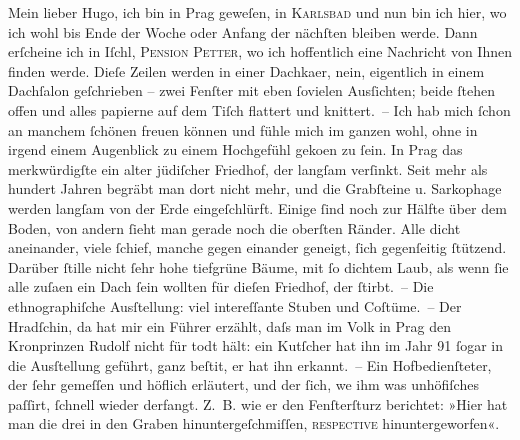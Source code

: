 \pstart{}Mein lieber Hugo,\pend\vspace{0.5em}
\pstart
           ich bin in Prag geweſen, in \textsc{Karlsbad} und nun bin ich hier, wo ich wohl bis Ende der Woche oder Anfang der nächſten
               bleiben werde. Dann erſcheine ich in Iſchl, \textsc{Pension Petter}, wo ich hoffentlich eine Nachricht von Ihnen finden werde. Dieſe Zeilen werden
               in einer Dachka{\geminationm}er, nein, eigentlich in einem Dachſalon
               geſchrieben – zwei Fenſter mit eben ſovielen Ausſichten; beide ſtehen offen und alles
               papierne {\pb}auf dem Tiſch flattert und knittert. – Ich hab
               mich ſchon an manchem ſchönen freuen können und fühle mich im ganzen wohl, ohne in
               irgend einem Augenblick zu einem Hochgefühl geko{\geminationm}en zu
               ſein. In Prag das merkwürdigſte ein alter jüdiſcher Friedhof, der
               langſam verſinkt. Seit mehr als hundert Jahren begräbt man dort nicht mehr, und die
               Grabſteine u. Sarkophage werden langſam von der Erde eingeſchlürft. Einige ſind noch
               zur Hälfte über dem Boden, von andern ſieht man gerade noch die oberſten Ränder. Alle
               dicht aneinander, viele ſchief, manche gegen einander geneigt, ſich gegenſeitig {\pb}ſtützend. Darüber ſtille nicht ſehr hohe tiefgrüne Bäume,
               mit ſo dichtem Laub, als wenn ſie alle zuſa{\geminationm}en ein Dach
               ſein wollten für dieſen Friedhof, der ſtirbt. – Die ethnographiſche
                  Ausſtellung: viel intereſſante Stuben und Coſtüme. – Der Hradſchin, da hat mir ein Führer erzählt, daſs man im Volk in
                  Prag den Kronprinzen Rudolf nicht für todt hält: ein Kutſcher hat ihn im Jahr
                  91{ }ſogar in die Ausſtellung geführt, ganz beſti{\geminationm}t, er hat ihn erkannt. – Ein Hofbedienſteter, der ſehr
               gemeſſen und höflich erläutert, und der ſich, we{\geminationn} ihm
               was unhöfiſches paſſirt, ſchnell wieder derfangt. Z. B. {\pb}wie er den Fenſterſturz berichtet: »Hier hat man die drei in den Graben
               hinuntergeſchmiſſen, \textsc{reſpective} hinuntergeworfen«.\pend
           

